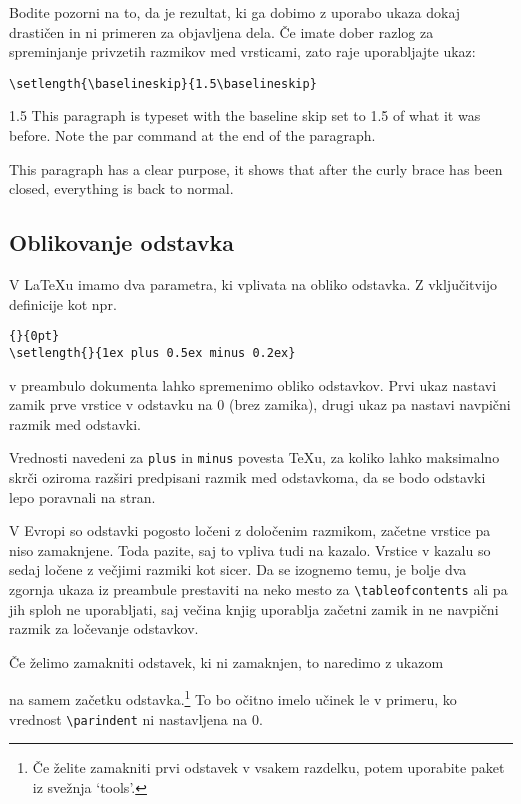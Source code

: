 Bodite pozorni na to, da je rezultat, ki ga dobimo z uporabo ukaza
 dokaj drastičen in ni primeren za objavljena dela.
Če imate dober razlog za spreminjanje privzetih razmikov med vrsticami,
zato raje uporabljajte ukaz:
\begin{lscommand}
\verb|\setlength{\baselineskip}{1.5\baselineskip}|
\end{lscommand}

\begin{example}
{\setlength{\baselineskip}%
           {1.5\baselineskip}
This paragraph is typeset with
the baseline skip set to 1.5 of
what it was before. Note the par
command at the end of the
paragraph.\par}

This paragraph has a clear
purpose, it shows that after the
curly brace has been closed,
everything is back to normal.
\end{example}

\subsection{Oblikovanje odstavka}\label{parsp}

V \LaTeX{}u imamo dva parametra, ki vplivata na obliko odstavka.
Z vključitvijo definicije kot npr.
\begin{code}
\verb|{|\verb|}{0pt}| \\
\verb|\setlength{|\verb|}{1ex plus 0.5ex minus 0.2ex}|
\end{code}
v preambulo dokumenta lahko spremenimo obliko odstavkov. Prvi ukaz nastavi
zamik prve vrstice v odstavku na 0 (brez zamika), drugi ukaz pa nastavi navpični razmik med
odstavki. 

Vrednosti navedeni za \texttt{plus} in \texttt{minus} povesta \TeX{}u, 
za koliko lahko maksimalno skrči oziroma razširi predpisani razmik med odstavkoma,
da se bodo odstavki lepo poravnali na stran.

V Evropi so odstavki pogosto ločeni z določenim razmikom, začetne vrstice pa niso zamaknjene.
Toda pazite, saj to vpliva tudi na kazalo. Vrstice v kazalu so sedaj ločene z večjimi razmiki kot sicer.
Da se izognemo temu, je bolje dva zgornja ukaza iz preambule prestaviti na neko mesto za 
\verb|\tableofcontents| ali pa jih sploh ne uporabljati, saj večina knjig uporablja začetni zamik in ne 
navpični razmik za ločevanje odstavkov.

Če želimo zamakniti odstavek, ki ni zamaknjen, to naredimo z ukazom
\begin{lscommand}
\end{lscommand}
\noindent na samem začetku odstavka.\footnote{Če želite zamakniti prvi odstavek v vsakem razdelku, potem 
uporabite paket  iz svežnja `tools'.} To bo očitno imelo učinek le v primeru,
ko vrednost \verb|\parindent| ni nastavljena na $0$.

